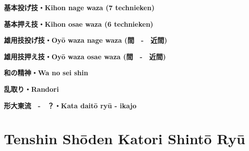 \documentclass[a4paper, 12pt]{article}
\begin{document}
\newpage
\begin{landscape}
\thispagestyle{empty} %
\begin{center}
    \textbf{基本投げ技・Kihon nage waza (7 technieken)}
\end{center}

\end{landscape}

\newpage
\thispagestyle{empty} %
\begin{landscape}
\begin{center}
    \textbf{基本押え技・Kihon osae waza (6 technieken)}
\end{center}

\end{landscape}

\newpage
\begin{center}
    \textbf{雄用技投げ技・Oy\={o} waza nage waza (間　-　近間)}
\end{center}


\begin{center}
    \textbf{雄用技押え技・Oy\={o} waza osae waza (間　-　近間)}
\end{center}


\begin{center}
    \textbf{和の精神・Wa no sei shin}
\end{center}


\begin{center}
    \textbf{乱取り・Randori}
\end{center}


\begin{center}
    \textbf{形大東流　-　？・Kata dait\={o} ry\={u} - ikajo}
\end{center}


\newpage
\section{Tenshin Sh\={o}den Katori Shint\={o} Ry\={u}}
\end{document}
